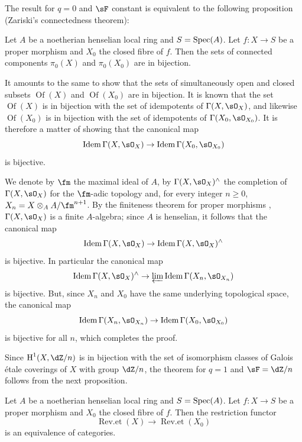 The result for $q=0$ and $\sF$ constant is equivalent to the following
proposition (Zariski's connectedness theorem):





\begin{proposition}\label{I:4-2-1}
Let $A$ be a noetherian henselian local ring and $S=\operatorname{Spec}(A)$.
Let $f:X\to S$ be a proper morphism and $X_0$ the closed fibre of $f$. Then
the sets of connected components $\pi_0(X)$ and $\pi_0(X_0)$ are in
bijection.
\end{proposition}

It amounts to the same to show that the sets of simultaneously open
and closed subsets $\operatorname{Of}(X)$ and $\operatorname{Of}(X_0)$ are
in bijection. It is known that the set $\operatorname{Of}(X)$ is in
bijection with the set of idempotents of $\Gamma(X,\sO_X)$, and likewise
$\operatorname{Of}(X_0)$ is in bijection with the set of
idempotents of $\Gamma(X_0,\sO_{X_0})$. It is therefore a matter of showing that
the canonical map
\[
  \operatorname{Idem} \Gamma(X,\sO_X) \to \operatorname{Idem}\Gamma(X_0,\sO_{X_0})
\]
is bijective.

We denote by $\fm$ the maximal ideal of $A$, by $\Gamma(X,\sO_X)^\wedge$ the
completion of $\Gamma(X,\sO_X)$ for the $\fm$-adic topology and, for every
integer $n\geqslant 0$, $X_n=X\otimes_A A/\fm^{n+1}$. By the finiteness theorem
for proper morphisms \cite[III.3.2]{ega}, $\Gamma(X,\sO_X)$ is a
finite $A$-algebra; since $A$ is henselian, it follows that
the canonical map
\[
  \operatorname{Idem} \Gamma(X,\sO_X) \to \operatorname{Idem}\Gamma(X,\sO_X)^\wedge
\]
is bijective. In particular the canonical map
\[
  \operatorname{Idem} \Gamma(X,\sO_X)^\wedge \to \varprojlim \operatorname{Idem}\Gamma(X_n,\sO_{X_n})
\]
is bijective. But, since $X_n$ and $X_0$ have the same underlying
topological space, the canonical map
\[
  \operatorname{Idem}\Gamma(X_n,\sO_{X_n}) \to \operatorname{Idem} \Gamma(X_0,\sO_{X_0})
\]
is bijective for all $n$, which completes the proof.

Since $\h^1(X,\dZ/n)$ is in bijection with the set of isomorphism classes
of Galois \'etale coverings of $X$ with group $\dZ/n$,
the theorem for $q=1$ and $\sF=\dZ/n$ follows from the next proposition. 





\begin{proposition}\label{I:4-2-2}
Let $A$ be a noetherian henselian local ring and $S=\operatorname{Spec}(A)$. Let
$f:X\to S$ be a proper morphism and $X_0$ the closed fibre of $f$. Then the
restriction functor
\[
  \operatorname{Rev.et}(X) \to \operatorname{Rev.et}(X_0)
\]
is an equivalence of categories.
\end{proposition}

